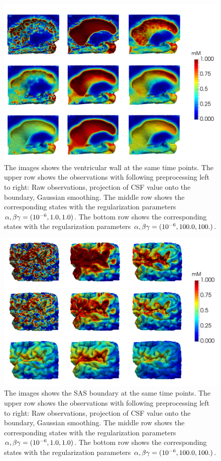 \documentclass[12pt,a4paper]{article}
\begin{document}
\begin{figure}
\centering
\includegraphics[scale=0.35]{../Vent-2.png} 
\caption{ The images shows the ventricular wall at the same time points. The upper row shows the observations with following preprocessing left to right: Raw observations, projection of CSF value onto the boundary, Gaussian smoothing. The middle row shows the corresponding states with the regularization parameters $\alpha , \beta \gamma = (10\sp{-6},1.0 ,1.0)$. The bottom row shows the corresponding states with the regularization parameters $\alpha , \beta \gamma = (10\sp{-6},100.0 ,100.)$. }
\label{VENT}
\end{figure}

\begin{figure}
\centering
\includegraphics[scale=0.35]{../SAS-2.png} 
\caption{ The images shows the SAS boundary at the same time points. The upper row shows the observations with following preprocessing left to right: Raw observations, projection of CSF value onto the boundary, Gaussian smoothing. The middle row shows the corresponding states with the regularization parameters $\alpha , \beta \gamma = (10\sp{-6},1.0 ,1.0)$. The bottom row shows the corresponding states with the regularization parameters $\alpha , \beta \gamma = (10\sp{-6},100.0 ,100.)$. }
\label{SAS}
\end{figure}
\end{document}
